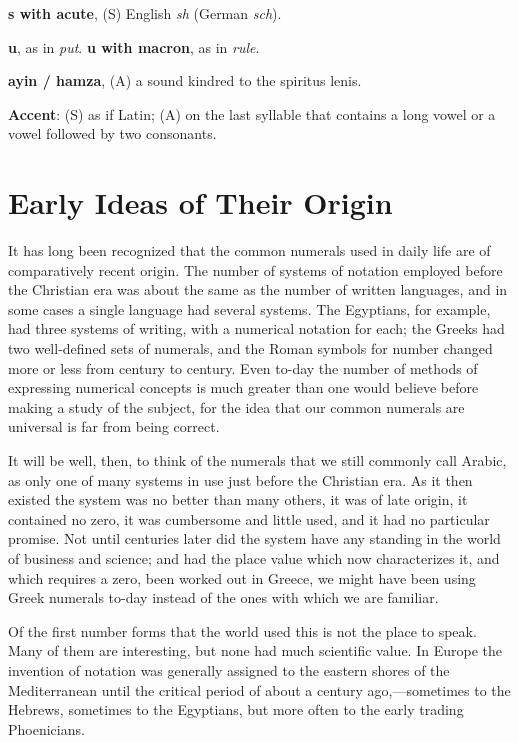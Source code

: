 \documentclass[11pt,a4paper]{article}
\begin{document}
\smallskip
\noindent\textbf{s with acute}, (S) English \textit{sh} (German \textit{sch}).

\smallskip
\noindent\textbf{u}, as in \textit{put}. \textbf{u with macron}, as in \textit{rule}.

\smallskip
\noindent\textbf{ayin / hamza}, (A) a sound kindred to the spiritus lenis.

\smallskip
\noindent\textbf{Accent}: (S) as if Latin; (A) on the last syllable that contains a long vowel or a vowel followed by two consonants.

\newpage

\section{Early Ideas of Their Origin}\label{ch:early-ideas}

It has long been recognized that the common numerals used in daily life are of comparatively recent origin. The number of systems of notation employed before the Christian era was about the same as the number of written languages, and in some cases a single language had several systems. The Egyptians, for example, had three systems of writing, with a numerical notation for each; the Greeks had two well-defined sets of numerals, and the Roman symbols for number changed more or less from century to century. Even to-day the number of methods of expressing numerical concepts is much greater than one would believe before making a study of the subject, for the idea that our common numerals are universal is far from being correct.

It will be well, then, to think of the numerals that we still commonly call Arabic, as only one of many systems in use just before the Christian era. As it then existed the system was no better than many others, it was of late origin, it contained no zero, it was cumbersome and little used, and it had no particular promise. Not until centuries later did the system have any standing in the world of business and science; and had the place value which now characterizes it, and which requires a zero, been worked out in Greece, we might have been using Greek numerals to-day instead of the ones with which we are familiar.

Of the first number forms that the world used this is not the place to speak. Many of them are interesting, but none had much scientific value. In Europe the invention of notation was generally assigned to the eastern shores of the Mediterranean until the critical period of about a century ago,---sometimes to the Hebrews, sometimes to the Egyptians, but more often to the early trading Phoenicians.
\end{document}
